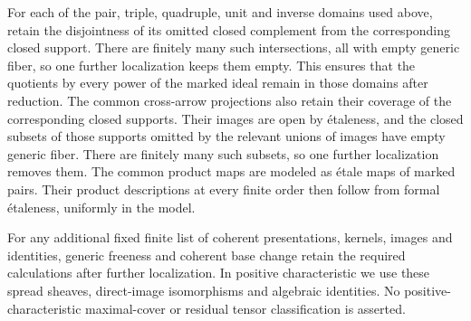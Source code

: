 For each of the pair, triple, quadruple, unit and inverse domains used
above, retain the disjointness of its omitted closed complement from
the corresponding closed support.  There are finitely many such
intersections, all with empty generic fiber, so one further localization
keeps them empty.  This ensures that the quotients by every power of
the marked ideal remain in those domains after reduction.  The common
cross-arrow projections also retain their coverage of the corresponding
closed supports.  Their images are open by \'etaleness, and the closed
subsets of those supports omitted by the relevant unions of images have
empty generic fiber.  There are finitely many such subsets, so one
further localization removes them.  The common
product maps are modeled as \'etale maps of marked pairs.  Their
product descriptions at every finite order then follow from formal
\'etaleness, uniformly in the model.

For any additional fixed finite list of coherent presentations,
kernels, images and identities, generic freeness and coherent base
change retain the required calculations after further localization.
In positive characteristic we use these spread sheaves, direct-image
isomorphisms and algebraic identities.  No positive-characteristic
maximal-cover or residual tensor classification is asserted.
